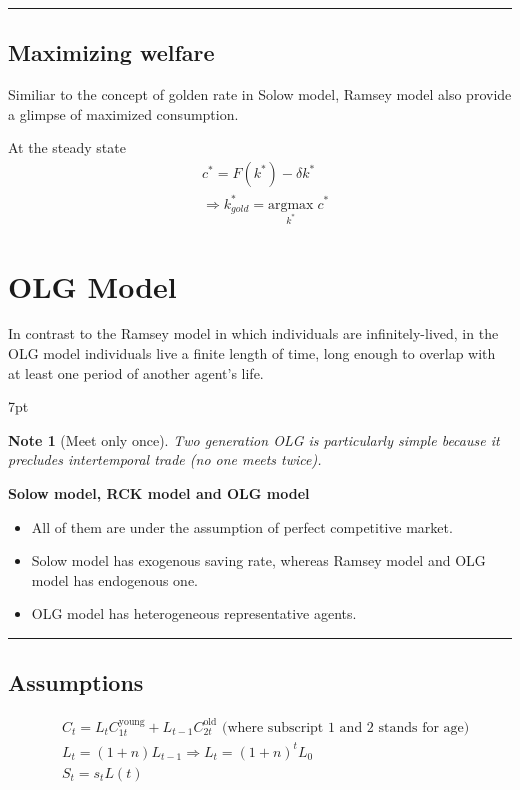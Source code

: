 \documentclass{article}
\providecommand{\tightlist}{
  \setlength{\itemsep}{0pt}
  \setlength{\parskip}{0pt}}
\newcommand*\sepline{%
  \begin{center}
    \rule[1ex]{.5\textwidth}{.5pt}
  \end{center}}
\newenvironment{blueblock}{
\def\FrameCommand{
  \hspace{1pt}
    {\color{DarkBlue}
    \vrule width 2pt}
    {\color{blueshade}
    \vrule width 4pt}
  \colorbox{blueshade}
}
\MakeFramed{
  \advance
  \hsize-
  \width
  \FrameRestore}
\noindent\hspace{-4.55pt}%
\begin{adjustwidth}{}{7pt}
\vspace{2pt}\vspace{2pt}
}
{\vspace{2pt}\end{adjustwidth}\endMakeFramed}
\newtheorem{note}{Note}
\begin{document}
\sepline
\subsection{Maximizing welfare}\label{maximizing-welfare}

Similiar to the concept of golden rate in Solow model, Ramsey model also provide a glimpse of maximized consumption.

At the steady state
\begin{align}
&c^{*}= F(k^{*})-\delta k^{*}
\\&\Rightarrow k^*_{gold}=\underset{k^*}{\text{argmax}} \;c^{*}
\end{align}











\newpage
\section{OLG Model}

In contrast to the Ramsey model in which individuals are infinitely-lived, in the OLG model individuals live a finite length of time, long enough to overlap with at least one period of another agent's life.

\begin{blueblock}
\begin{note}[Meet only once]
Two generation OLG is particularly simple because it precludes
intertemporal trade (no one meets twice).
\end{note}
\end{blueblock}

\textbf{Solow model, RCK model and OLG model}
\begin{itemize}
\tightlist
  \item All of them are under the assumption of perfect competitive market.
  \item Solow model has exogenous saving rate, whereas Ramsey model and OLG model has endogenous one.
  \item OLG model has heterogeneous representative agents.
\end{itemize}


\sepline
\subsection{Assumptions}
\begin{align}
&C_{t}= L_{t} C_{1t}^{\text{young}}+L_{t-1}C_{2t}^{\text{old}} \text{ (where subscript 1 and 2 stands for age)}
\\&L_{t}=(1+n)L_{t-1} \Rightarrow L_{t}=(1+n)^{t}L_{0}
\\&S_{t}=s_{t}L(t)
\end{align}
\end{document}
